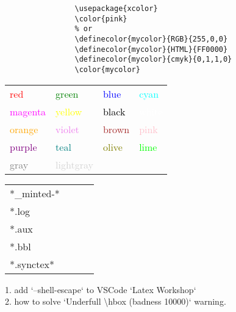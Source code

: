 \documentclass{article}
\begin{document}
\begin{multicols}{2}
\begin{minipage}{0.45\textwidth}
\begin{tcolorbox}[colback=orange!30, colframe=orange!60, title=Custom-color]
            \begin{verbatim}
                \usepackage{xcolor}  
                \color{pink}  
                % or  
                \definecolor{mycolor}{RGB}{255,0,0}
                \definecolor{mycolor}{HTML}{FF0000}
                \definecolor{mycolor}{cmyk}{0,1,1,0}
                \color{mycolor}
            \end{verbatim}
        \end{tcolorbox}
        \begin{tcolorbox}[colback=magenta!30, colframe=magenta!60, title=Color]
            \begin{tabular}{llll}
                \textcolor{red}{red}         & \textcolor{green}{green}         & \textcolor{blue}{blue}   & \textcolor{cyan}{cyan}   \\
                \textcolor{magenta}{magenta} & \textcolor{yellow}{yellow}       & \textcolor{black}{black} & \textcolor{white}{white} \\
                \textcolor{orange}{orange}   & \textcolor{violet}{violet}       & \textcolor{brown}{brown} & \textcolor{pink}{pink}   \\
                \textcolor{purple}{purple}   & \textcolor{teal}{teal}           & \textcolor{olive}{olive} & \textcolor{lime}{lime}   \\
                \textcolor{gray}{gray}       & \textcolor{lightgray}{lightgray} &                          &                          
            \end{tabular}
        \end{tcolorbox}
        \begin{tcolorbox}[colback=cyan!30, colframe=cyan!60, title=.gitignore]
            \begin{tabular}{llll}
                *\_minted-* &  &  & \\
                *.log      &  &  & \\
                *.aux      &  &  & \\
                *.bbl      &  &  & \\
                *.synctex* &  &  &
            \end{tabular}
        \end{tcolorbox}

        \begin{tcolorbox}[colback=pink!30, colframe=pink!60, title=Others]
            1. add `--shell-escape` to VSCode `Latex Workshop`  \\
            2. how to solve `Underfull \textbackslash{hbox} (badness 10000)` warning.
        \end{tcolorbox}
    \end{minipage}
\end{multicols}
\end{document}

